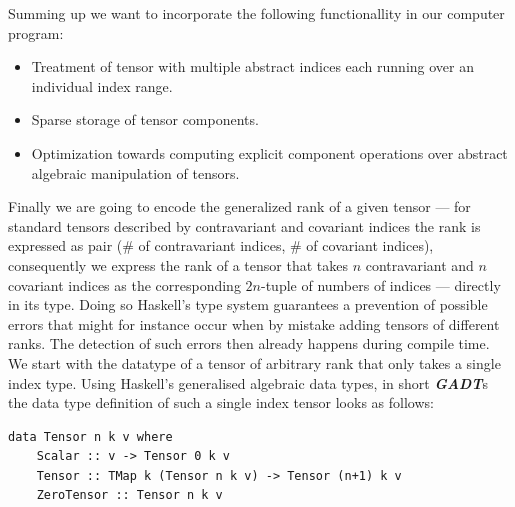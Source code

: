 \documentclass[a4paper,12pt, DIV=14, BCOR=5mm, twoside, headsepline]{scrbook}
\begin{document}
Summing up we want to incorporate the following functionallity in our computer program:
\begin{itemize}
    \item Treatment of tensor with multiple abstract indices each running over an individual index range. 
    \item Sparse storage of tensor components.
    \item Optimization towards computing explicit component operations over abstract algebraic manipulation of tensors.
\end{itemize}
Finally we are going to encode the generalized rank of a given tensor --- for standard tensors described by contravariant and covariant indices the rank is expressed as pair ($\#$ of contravariant indices, $\#$ of covariant indices), consequently we express the rank of a tensor that takes $n$ contravariant and $n$ covariant indices as the corresponding $2n$-tuple of numbers of indices --- directly in its type. Doing so Haskell's type system guarantees a prevention of possible errors that might for instance occur when by mistake adding tensors of different ranks. The detection of such errors then already happens during compile time. We start with the datatype of a tensor of arbitrary rank that only takes a single index type. Using Haskell's generalised algebraic data types, in short \textit{\textbf{GADT}}s the data type definition of such a single index tensor looks as follows: 

\begin{samepage}
\begin{verbatim}
data Tensor n k v where 
    Scalar :: v -> Tensor 0 k v 
    Tensor :: TMap k (Tensor n k v) -> Tensor (n+1) k v
    ZeroTensor :: Tensor n k v
\end{verbatim} 
\end{samepage}
\end{document}
